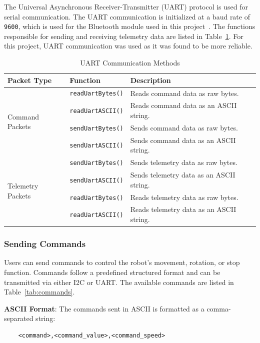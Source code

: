 The Universal Asynchronous Receiver-Transmitter (UART) protocol is used for serial communication. The UART communication is initialized at a baud rate of \texttt{9600}, which is used for the Bluetooth module used in this project~\cite{bluetooth_module}. The functions responsible for sending and receiving telemetry data are listed in Table~\ref{tab:uart_methods}. For this project, UART communication was used as it was found to be more reliable.
\begin{table}[h]
	\centering
	\caption{UART Communication Methods}
	\begin{tabular}{|l|l|l|}
		\hline
		\textbf{Packet Type} & \textbf{Function} & \textbf{Description} \\ \hline
		\multirow{4}{*}{Command Packets} & \texttt{readUartBytes()} & Reads command data as raw bytes. \\ \cline{2-3}
		& \texttt{readUartASCII()} & Reads command data as an ASCII string. \\ \cline{2-3}
		& \texttt{sendUartBytes()} & Sends command data as raw bytes. \\ \cline{2-3}
		& \texttt{sendUartASCII()} & Sends command data as an ASCII string. \\ \hline
		\multirow{4}{*}{Telemetry Packets} & \texttt{sendUartBytes()} & Sends telemetry data as raw bytes. \\ \cline{2-3}
		& \texttt{sendUartASCII()} & Sends telemetry data as an ASCII string. \\ \cline{2-3}
		& \texttt{readUartBytes()} & Reads telemetry data as raw bytes. \\ \cline{2-3}
		& \texttt{readUartASCII()} & Reads telemetry data as an ASCII string. \\ \hline
	\end{tabular}
	\label{tab:uart_methods}
\end{table}




\subsubsection{Sending Commands}
Users can send commands to control the robot’s movement, rotation, or stop function. Commands follow a predefined structured format and can be transmitted via either I2C or UART. The available commands are listed in Table~\ref{tab:commands}.

\textbf{ASCII Format}:
The commands sent in ASCII is formatted as a comma-separated string:
\begin{lstlisting}
	<command>,<command_value>,<command_speed>
\end{lstlisting}

